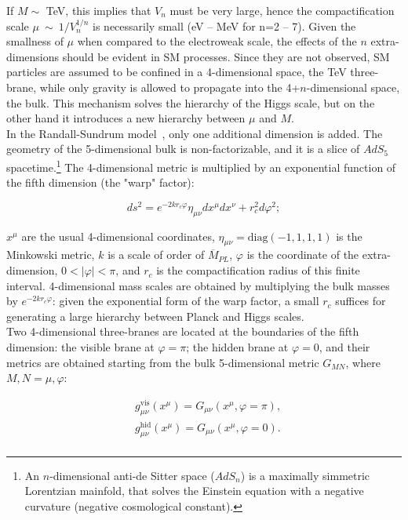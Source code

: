 \noindent If $M \sim$ TeV, this implies that $V_n$ must be very large, hence the compactification scale $\mu~\sim~1/V_n^{1/n}$ is necessarily small (eV -- MeV for n=2 -- 7).  Given the smallness of $\mu$ when compared to the electroweak scale, the effects of the $n$ extra-dimensions should be evident in SM processes. Since they are not observed, SM particles are assumed to be confined in a 4-dimensional space, the TeV three-brane, while only gravity is allowed to propagate into the 4+$n$-dimensional space, the bulk. This mechanism solves the hierarchy of the Higgs scale, but on the other hand it introduces a new hierarchy between $\mu$ and $M$.\\
In the Randall-Sundrum model~\cite{Randall:1999ee,Randall:1999vf}, only one additional dimension is added. The geometry of the 5-dimensional bulk is non-factorizable, and it is a slice of $AdS_5$ spacetime.\footnote{An $n$-dimensional anti-de Sitter space ($AdS_n$) is a maximally simmetric Lorentzian mainfold, that solves the Einstein equation with a negative curvature (negative cosmological constant).} The 4-dimensional metric is multiplied by an exponential function of the fifth dimension (the "warp" factor):

\begin{equation}
ds^2 = e^{-2 k r_c \varphi} \eta_{\mu \nu} dx^{\mu} dx^{\nu} + r_c^2 d{\varphi}^2;
\label{eq:theory_metric}
\end{equation}

\noindent $x^{\mu}$ are the usual 4-dimensional coordinates, $\eta_{\mu \nu} = \text{diag}(-1, 1, 1, 1)$ is the Minkowski metric, $k$ is a scale of order of $\overline{M}_{PL}$, $\varphi$ is the coordinate of the extra-dimension, $0 < |\varphi| < \pi$, and $r_c$ is the compactification radius of this finite interval. 4-dimensional mass scales are obtained by multiplying the bulk masses by $e^{-2 k r_c \varphi}$: given the exponential form of the warp factor, a small $r_c$ suffices for generating a large hierarchy between Planck and Higgs scales.\\
Two 4-dimensional three-branes are located at the boundaries of the fifth dimension: the visible brane at $\varphi = \pi$; the hidden brane at $\varphi = 0$, and their metrics are obtained starting from the bulk 5-dimensional metric $G_{MN}$, where $M,N = \mu, \varphi$:

\begin{equation}
\begin{split}
 & g_{\mu \nu}^{\text{vis}} (x^{\mu}) = G_{\mu \nu} \left( x^{\mu}, \varphi = \pi \right),\\
 & g_{\mu \nu}^{\text{hid}} (x^{\mu}) = G_{\mu \nu} \left( x^{\mu}, \varphi = 0 \right).\\
\end{split}
\label{eq:theory_brane_metrics}
\end{equation}

